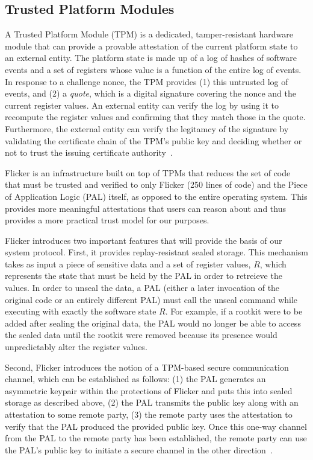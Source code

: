 \documentclass{article}
\begin{document}
\subsection{Trusted Platform Modules}

A Trusted Platform Module (TPM) is a dedicated, tamper-resistant hardware module that can provide a provable attestation of the current platform state to an external entity. The platform state is made up of a log of hashes of software events and a set of registers whose value is a function of the entire log of events. In response to a challenge nonce, the TPM provides (1) this untrusted log of events, and (2) a \textit{quote}, which is a digital signature covering the nonce and the current register values. An external entity can verify the log by using it to recompute the register values and confirming that they match those in the quote. Furthermore, the external entity can verify the legitamcy of the signature by validating the certificate chain of the TPM's public key and deciding whether or not to trust the issuing certificate authority~\cite{tpm-iso}.

Flicker is an infrastructure built on top of TPMs that reduces the set of code that must be trusted and verified to only Flicker (250 lines of code) and the Piece of Application Logic (PAL) itself, as opposed to the entire operating system. This provides more meaningful attestations that users can reason about and thus provides a more practical trust model for our purposes.

Flicker introduces two important features that will provide the basis of our system protocol.
First, it provides replay-resistant sealed storage. This mechanism takes as input a piece of sensitive data and a set of register values, $R$, which represents the state that must be held by the PAL in order to retreieve the values. In order to unseal the data, a PAL (either a later invocation of the original code or an entirely different PAL) must call the unseal command while executing with exactly the software state $R$. For example, if a rootkit were to be added after sealing the original data, the PAL would no longer be able to access the sealed data until the rootkit were removed because its presence would unpredictably alter the register values.

Second, Flicker introduces the notion of a TPM-based secure communication channel, which can be established as follows: (1) the PAL generates an asymmetric keypair within the protections of Flicker and puts this into sealed storage as described above, (2) the PAL transmits the public key along with an attestation to some remote party, (3) the remote party uses the attestation to verify that the PAL produced the provided public key. Once this one-way channel from the PAL to the remote party has been established, the remote party can use the PAL's public key to initiate a secure channel in the other direction~\cite{flicker}.
\end{document}
